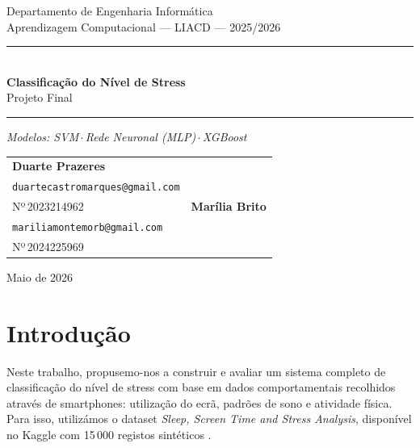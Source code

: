 \documentclass[12pt,a4paper]{article}
\begin{document}
\begin{titlepage}
\centering

\vspace*{2cm}

{\large Departamento de Engenharia Informática}\\[0.3em]
{\normalsize Aprendizagem Computacional --- LIACD --- 2025/2026}

\vspace{3cm}

\rule{\textwidth}{1.5pt}\\[0.6em]
{\LARGE\bfseries Classificação do Nível de Stress}\\[0.4em]
{\large Projeto Final}\\[0.6em]
\rule{\textwidth}{1.5pt}

\vspace{0.8em}
{\normalsize\itshape Modelos: SVM\,$\cdot$\,Rede Neuronal (MLP)\,$\cdot$\,XGBoost}

\vspace{2.5cm}

\begin{tabular}{p{}p{}}
  \centering
  \textbf{Duarte Prazeres}\\[0.3em]
  \small\texttt{duartecastromarques@gmail.com}\\[0.2em]
  \small Nº\,2023214962
  &
  \centering
  \textbf{Marília Brito}\\[0.3em]
  \small\texttt{mariliamontemorb@gmail.com}\\[0.2em]
  \small Nº\,2024225969
\end{tabular}

\vfill
{\large Maio de 2026}

\end{titlepage}
\newpage
\tableofcontents
\newpage

\section{Introdução}

Neste trabalho, propusemo-nos a construir e avaliar um sistema completo de classificação
do nível de stress com base em dados comportamentais recolhidos através de smartphones:
utilização do ecrã, padrões de sono e atividade física. Para isso, utilizámos o dataset
\textit{Sleep, Screen Time and Stress Analysis}, disponível no Kaggle com 15\,000 registos
sintéticos \cite{kaggle}.
\end{document}
